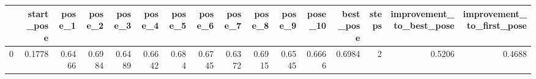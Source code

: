 \begin{tabular}{lrrrrrrrrrrrrrrr}
\toprule
{} &  start\_pose &  pose\_1 &  pose\_2 &  pose\_3 &  pose\_4 &  pose\_5 &  pose\_6 &  pose\_7 &  pose\_8 &  pose\_9 &  pose\_10 &  best\_pose &  steps &  improvement\_to\_best\_pose &  improvement\_to\_first\_pose \\
\midrule
0 &      0.1778 &  0.6466 &  0.6984 &  0.6489 &  0.6642 &   0.684 &  0.6745 &  0.6372 &  0.6915 &  0.6545 &   0.6666 &     0.6984 &      2 &                    0.5206 &                     0.4688 \\
\bottomrule
\end{tabular}
